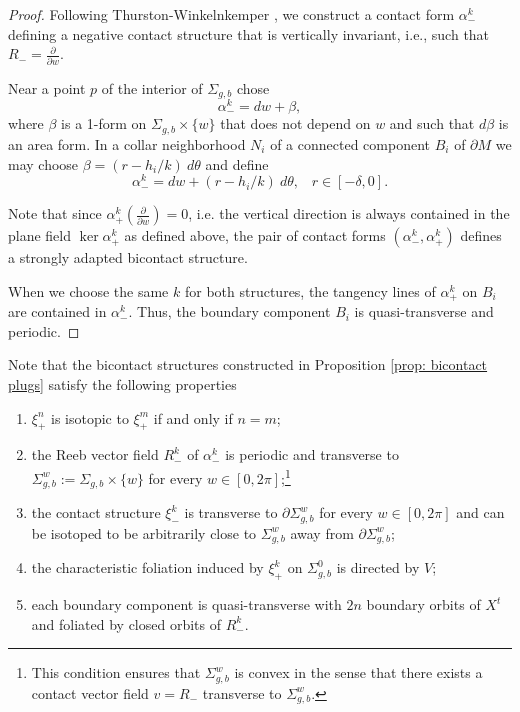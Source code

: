 \documentclass{amsart}
\theoremstyle{definition}
\theoremstyle{remark}
\begin{document}
 \begin{proof}
    Following Thurston-Winkelnkemper \cite{ThurstonWinkelnkemper1975}, we construct a contact form $\alpha^k_-$ defining a negative contact structure that is vertically invariant, i.e., such that $R_-=\frac{\partial}{\partial w}$.
 
 Near a point $p$ of the interior of $\Sigma_{g,b}$ chose
 $$\alpha^k_-=dw+\beta,$$ where $\beta$ is a 1-form on $\Sigma_{g,b}\times \{w\}$ that does not depend on $w$ and such that $d\beta$ is an area form. In a collar neighborhood $N_i$ of a connected component $B_i$ of $\partial M$ we may choose $\beta=(r-h_i/k)\:d\theta$ and define 
$$\alpha^k_-=dw+(r-h_i/k)\:d\theta,\;\;\;r\in[-\delta,0].$$

Note that since $\alpha^k_+(\frac{\partial}{\partial w})=0$, i.e. the vertical direction is always contained in the plane field $\ker \alpha^k_+$ as defined above, the pair of contact forms $(\alpha^k_-,\alpha^k_+)$ defines a strongly adapted bicontact structure.

When we choose the same $k$ for both structures, the tangency lines of $\alpha^k_+$ on $B_i$ are contained in $\alpha^k_-$. Thus, the boundary component $B_i$ is quasi-transverse and periodic. 
 \end{proof}




Note that the bicontact structures constructed in Proposition \ref{prop: bicontact plugs} satisfy the following properties
\begin{enumerate}
    \item $\xi_+^n$ is isotopic to $\xi_+^m$ if and only if $n = m$;
    \item the Reeb vector field $R_-^k$ of $\alpha_-^k$ is periodic and transverse to $\Sigma_{g,b}^w := \Sigma_{g,b} \times \{w\}$ for every $w \in [0, 2\pi]$;\footnote{This condition ensures that $\Sigma_{g,b}^w$ is convex in the sense that there exists a contact vector field $v = R_-$ transverse to $\Sigma_{g,b}^w$.}
    \item the contact structure $\xi_-^k$ is transverse to $\partial \Sigma_{g,b}^w$ for every $w \in [0, 2\pi]$ and can be isotoped to be arbitrarily close to $\Sigma_{g,b}^w$ away from $\partial \Sigma_{g,b}^w$;
    \item the characteristic foliation induced by $\xi_+^k$ on $\Sigma_{g,b}^0$ is directed by $V$;
    \item each boundary component is quasi-transverse with $2n$ boundary orbits of $X^t$ and foliated by closed orbits of $R_-^k$.
\end{enumerate}
\end{document}
